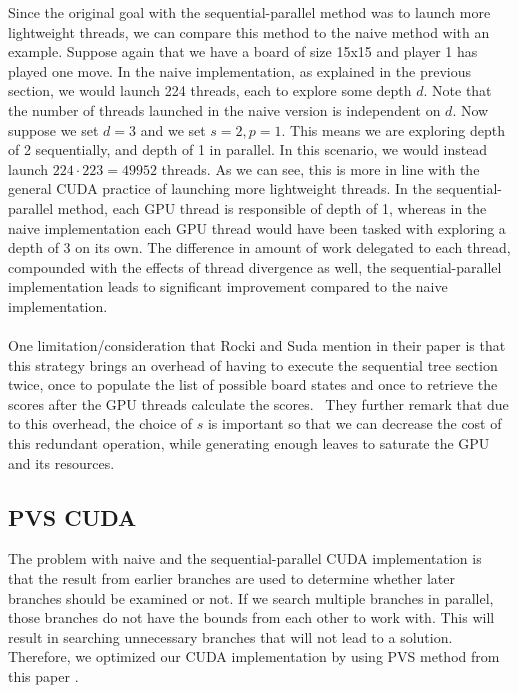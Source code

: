 \noindent
Since the original goal with the sequential-parallel method was to launch more lightweight threads, we can compare this method to the naive method with an example. Suppose again that we have a board of size 15x15 and player 1 has played one move. In the naive implementation, as explained in the previous section, we would launch 224 threads, each to explore some depth $d$. Note that the number of threads launched in the naive version is independent on $d$. Now suppose we set $d=3$ and we set $s=2, p=1$. This means we are exploring depth of 2 sequentially, and depth of 1 in parallel. In this scenario, we would instead launch $224\cdot 223=49952$ threads. As we can see, this is more in line with the general CUDA practice of launching more lightweight threads. In the sequential-parallel method, each GPU thread is responsible of depth of 1, whereas in the naive implementation each GPU thread would have been tasked with exploring a depth of 3 on its own. The difference in amount of work delegated to each thread, compounded with the effects of thread divergence as well, the sequential-parallel implementation leads to significant improvement compared to the naive implementation.\\
\\
One limitation/consideration that Rocki and Suda mention in their paper is that this strategy brings an overhead of having to execute the sequential tree section twice, once to populate the list of possible board states and once to retrieve the scores after the GPU threads calculate the scores.~\cite{Rocki} They further remark that due to this overhead, the choice of $s$ is important so that we can decrease the cost of this redundant operation, while generating enough leaves to saturate the GPU and its resources.




\subsection{PVS CUDA}
The problem with naive and the sequential-parallel CUDA implementation is that the result from earlier branches are used to determine whether later branches should be examined or not. If we search multiple branches in parallel, those branches do not have the bounds from each other to work with. This will result in searching unnecessary branches that will not lead to a solution. Therefore, we optimized our CUDA implementation by using PVS method from this paper \cite{pvsgpu}.\\

